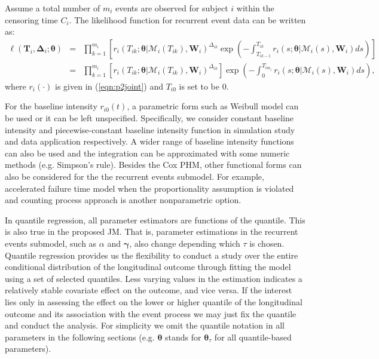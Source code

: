 Assume a total number of $m_i$ events are observed for subject $i$ within the censoring time $C_i$. The likelihood function for recurrent event data can be written as:
{\small
\begin{eqnarray}\label{eqn:p2lik_sur}
\ell({\boldsymbol T}_i, \boldsymbol{\Delta}_i;\boldsymbol{\theta})&=& \nonumber \prod_{k=1}^{m_i}\left[r_i(T_{ik};\boldsymbol{\theta}|\mathcal{M}_{i}(T_{ik}), \boldsymbol{W}_i)^{\Delta_{ik}}\exp\left(-\int_{T_{ik-1}}^{T_{ik}}r_i(s;\boldsymbol{\theta}|\mathcal{M}_{i}(s), \boldsymbol{W}_i)ds\right)\right]\\
&=& \prod_{k=1}^{m_i}\left[r_i(T_{ik};\boldsymbol{\theta}|\mathcal{M}_{i}(T_{ik}), \boldsymbol{W}_i)^{\Delta_{ik}}\right]\exp\left(-\int_0^{T_{im_i}}r_i(s;\boldsymbol{\theta}|\mathcal{M}_{i}(s), \boldsymbol{W}_i)ds\right),
\end{eqnarray}
}
\noindent where $r_i(\cdot)$ is given in (\ref{eqn:p2joint}) and $T_{i0}$ is set to be 0.

For the baseline intensity $r_{i0}(t)$, a parametric form such as Weibull model can be used or it can be left unspecified. Specifically, we consider constant baseline intensity and piecewise-constant baseline intensity function in simulation study and data application respectively. A wider range of baseline intensity functions can also be used and the integration can be approximated with some numeric methods (e.g. Simpson's rule). Besides the Cox PHM, other functional forms can also be considered for the the recurrent events submodel. For example, accelerated failure time model when the proportionality assumption is violated and counting process approach is another nonparametric option.

In quantile regression, all parameter estimators are functions of the quantile. This is also true in the proposed JM. That is, parameter estimations in the recurrent events submodel, such as $\alpha$ and $\boldsymbol{\gamma}$, also change depending which $\tau$ is chosen. Quantile regression provides us the flexibility to conduct a study over the entire conditional distribution of the longitudinal outcome through fitting the model using a set of selected quantiles. Less varying values in the estimation indicates a relatively stable covariate effect on the outcome, and vice versa. If the interest lies only in assessing the effect on the lower or higher quantile of the longitudinal outcome and its association with the event process we may just fix the quantile and conduct the analysis. For simplicity we omit the quantile notation in all parameters in the following sections (e.g. $\boldsymbol{\theta}$ stands for $\boldsymbol{\theta}_{\tau}$ for all quantile-based parameters).


